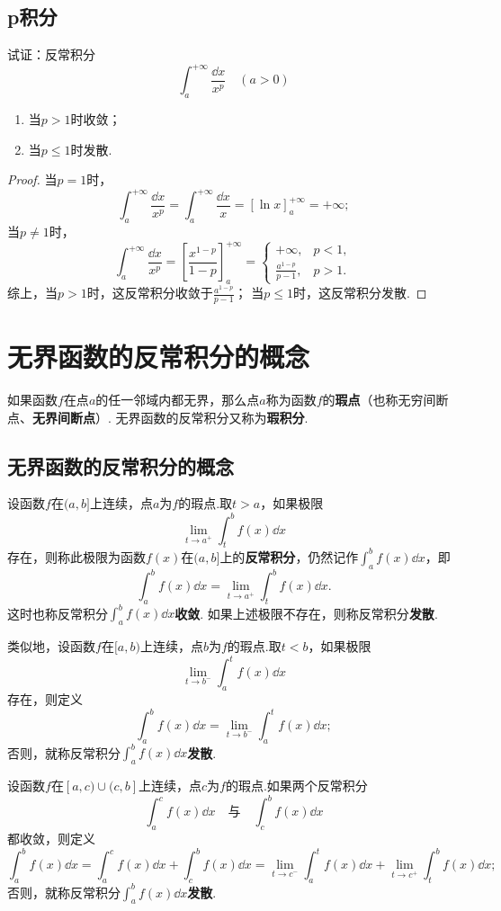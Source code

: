 \subsection{p积分}
\begin{example}[p积分]\label{example:定积分.p积分}
试证：反常积分\[
\int_a^{+\infty} \frac{\dd{x}}{x^p} \quad(a>0)
\]\begin{enumerate}
\item 当\(p > 1\)时收敛；
\item 当\(p \leqslant 1\)时发散.
\end{enumerate}
\begin{proof}
\def\arraystretch{1.5}
当\(p=1\)时，\[
\int_a^{+\infty} \frac{\dd{x}}{x^p}
= \int_a^{+\infty} \frac{\dd{x}}{x}
= [\ln x]_a^{+\infty} = +\infty;
\]当\(p\neq1\)时，\[
\int_a^{+\infty} \frac{\dd{x}}{x^p}
= \left[ \frac{x^{1-p}}{1-p} \right]_a^{+\infty}
= \left\{ \begin{array}{cl}
+\infty, & p<1, \\
\frac{a^{1-p}}{p-1}, & p>1.
\end{array} \right.
\]
综上，当\(p > 1\)时，这反常积分收敛于\(\frac{a^{1-p}}{p-1}\)；
当\(p\leqslant1\)时，这反常积分发散.
\end{proof}
\end{example}

\section{无界函数的反常积分的概念}
如果函数\(f\)在点\(a\)的任一邻域内都无界，那么点\(a\)称为函数\(f\)的\textbf{瑕点}（也称无穷间断点、\textbf{无界间断点}）.
无界函数的反常积分又称为\textbf{瑕积分}.
\subsection{无界函数的反常积分的概念}
\begin{definition}\label{definition:定积分.无界函数的反常积分的定义}
设函数\(f\)在\((a,b]\)上连续，点\(a\)为\(f\)的瑕点.取\(t > a\)，如果极限\[
\lim\limits_{t \to a^+} \int_t^b f(x) \dd{x}
\]存在，则称此极限为函数\(f(x)\)在\((a,b]\)上的\textbf{反常积分}，仍然记作\(\int_a^b f(x) \dd{x}\)，即\[
\int_a^b f(x) \dd{x} = \lim\limits_{t \to a^+} \int_t^b f(x) \dd{x}.
\]这时也称反常积分\(\int_a^b f(x) \dd{x}\)\textbf{收敛}.
如果上述极限不存在，则称反常积分\textbf{发散}.

类似地，设函数\(f\)在\([a,b)\)上连续，点\(b\)为\(f\)的瑕点.取\(t < b\)，如果极限\[
\lim\limits_{t \to b^-} \int_a^t f(x) \dd{x}
\]存在，则定义\[
\int_a^b f(x) \dd{x}
= \lim\limits_{t \to b^-} \int_a^t f(x) \dd{x};
\]否则，就称反常积分\(\int_a^b f(x) \dd{x}\)\textbf{发散}.

设函数\(f\)在\([a,c)\cup(c,b]\)上连续，点\(c\)为\(f\)的瑕点.如果两个反常积分\[
\int_a^c f(x) \dd{x}
\quad\text{与}\quad
\int_c^b f(x) \dd{x}
\]都收敛，则定义\[
\int_a^b f(x) \dd{x}
= \int_a^c f(x) \dd{x} + \int_c^b f(x) \dd{x}
= \lim\limits_{t \to c^-} \int_a^t f(x) \dd{x}
	+ \lim\limits_{t \to c^+} \int_t^b f(x) \dd{x};
\]否则，就称反常积分\(\int_a^b f(x) \dd{x}\)\textbf{发散}.
\end{definition}

